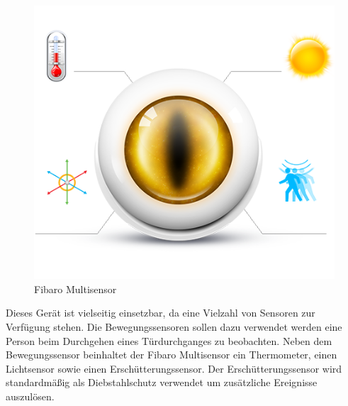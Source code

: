 \begin{figure}[h!]
	\centering
	\includegraphics[scale=0.4]{img/Sensorevaluation/FibaroMulti.png}
	\caption{Fibaro Multisensor}
	\label{fig:sensorenFibaroMulti}
\end{figure}

Dieses Gerät ist vielseitig einsetzbar, da eine Vielzahl von Sensoren zur Verfügung stehen. Die Bewegungssensoren sollen dazu verwendet werden eine Person beim Durchgehen eines Türdurchganges zu beobachten.
Neben dem Bewegungssensor beinhaltet der Fibaro Multisensor ein Thermometer, einen Lichtsensor sowie einen Erschütterungssensor.
Der Erschütterungssensor wird standardmäßig als Diebstahlschutz verwendet um zusätzliche Ereignisse auszulösen.

